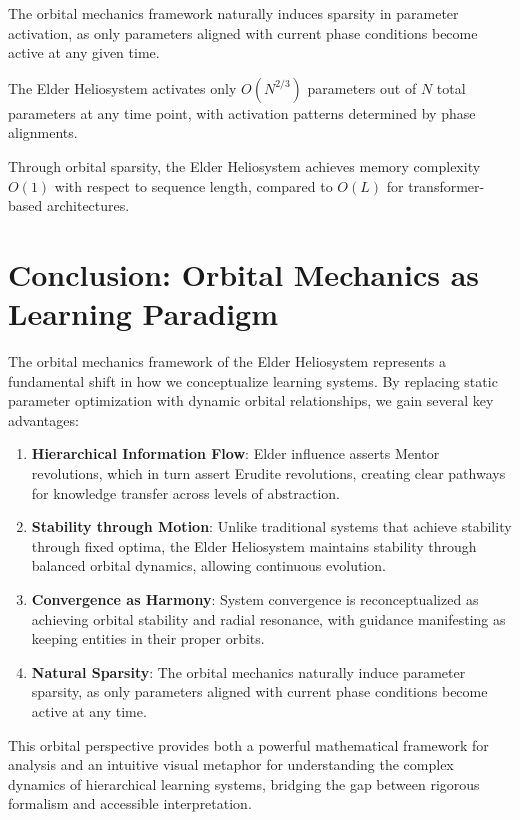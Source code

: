 The orbital mechanics framework naturally induces sparsity in parameter activation, as only parameters aligned with current phase conditions become active at any given time.

\begin{proposition}
The Elder Heliosystem activates only $O(N^{2/3})$ parameters out of $N$ total parameters at any time point, with activation patterns determined by phase alignments.
\end{proposition}

\begin{corollary}
Through orbital sparsity, the Elder Heliosystem achieves memory complexity $O(1)$ with respect to sequence length, compared to $O(L)$ for transformer-based architectures.
\end{corollary}



\section{Conclusion: Orbital Mechanics as Learning Paradigm}

The orbital mechanics framework of the Elder Heliosystem represents a fundamental shift in how we conceptualize learning systems. By replacing static parameter optimization with dynamic orbital relationships, we gain several key advantages:

\begin{enumerate}
    \item \textbf{Hierarchical Information Flow}: Elder influence asserts Mentor revolutions, which in turn assert Erudite revolutions, creating clear pathways for knowledge transfer across levels of abstraction.
    
    \item \textbf{Stability through Motion}: Unlike traditional systems that achieve stability through fixed optima, the Elder Heliosystem maintains stability through balanced orbital dynamics, allowing continuous evolution.
    
    \item \textbf{Convergence as Harmony}: System convergence is reconceptualized as achieving orbital stability and radial resonance, with guidance manifesting as keeping entities in their proper orbits.
    
    \item \textbf{Natural Sparsity}: The orbital mechanics naturally induce parameter sparsity, as only parameters aligned with current phase conditions become active at any time.
\end{enumerate}

This orbital perspective provides both a powerful mathematical framework for analysis and an intuitive visual metaphor for understanding the complex dynamics of hierarchical learning systems, bridging the gap between rigorous formalism and accessible interpretation.